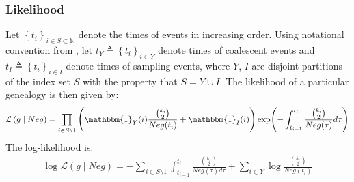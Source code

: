 \documentclass{report}
\newcommand{\N}{\mathbb{N}}
\theoremstyle{definition}
\begin{document}
\subsubsection{Likelihood}\label{subsection:likelihood}
Let $\left\{t_i\right\}_{i\in S\subset \N}$ denote the times of events in increasing order. Using notational convention from \cite{drummond_estimating_2002}, let $t_Y\triangleq \left\{t_i\right\}_{i\in Y}$ denote times of coalescent events and $t_I\triangleq \left\{t_i\right\}_{i\in I}$ denote times of sampling events, where $Y$, $I$ are disjoint partitions of the index set $S$ with the property that $S = Y\cup I$.
The likelihood of a particular genealogy is then given by:
\begin{gather}
\mathcal{L}\left(g\mid Neg\right) 
= \prod_{i\in S\setminus 1}\left(\mathbbm{1}_Y(i)\frac{\binom{k_{i}}{2}}{Neg(t_i)}+\mathbbm{1}_I(i)\right)
\exp(-\int_{t_{i-1}}^{t_i}\frac{\binom{k_{i}}{2}}{Neg(\tau)}d\tau)
\end{gather}
The log-likelihood is:
\begin{gather}
\log\mathcal{L}\left(g\mid Neg\right) 
= -\sum_{i\in S\setminus 1}{\int_{t_{i-1}}^{t_i}{\frac{\binom{k_{i}}{2}}{Neg(\tau)d\tau}}} + \sum_{i\in Y}{\log\frac{\binom{k_{i}}{2}}{Neg(t_i)}}
\end{gather}
\end{document}
